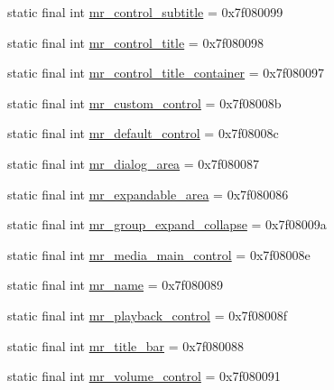 \begin{CompactItemize}
\item 
static final int \hyperlink{classandroid_1_1support_1_1graphics_1_1drawable_1_1_r_1_1id_e5a65a00b707670e18d959e97b9fd855}{mr\_\-control\_\-subtitle} = 0x7f080099
\item 
static final int \hyperlink{classandroid_1_1support_1_1graphics_1_1drawable_1_1_r_1_1id_81fac9292661e4502e602bba3b30abbc}{mr\_\-control\_\-title} = 0x7f080098
\item 
static final int \hyperlink{classandroid_1_1support_1_1graphics_1_1drawable_1_1_r_1_1id_1b9d52d6a6a8135008e786a7ff9d0e48}{mr\_\-control\_\-title\_\-container} = 0x7f080097
\item 
static final int \hyperlink{classandroid_1_1support_1_1graphics_1_1drawable_1_1_r_1_1id_e15581ce8c6802f902d4b3cb4029c5d1}{mr\_\-custom\_\-control} = 0x7f08008b
\item 
static final int \hyperlink{classandroid_1_1support_1_1graphics_1_1drawable_1_1_r_1_1id_dbf4a0f605692a7ca11e0a5dcc263946}{mr\_\-default\_\-control} = 0x7f08008c
\item 
static final int \hyperlink{classandroid_1_1support_1_1graphics_1_1drawable_1_1_r_1_1id_c086f96063efac0f7daf85971fcd07f6}{mr\_\-dialog\_\-area} = 0x7f080087
\item 
static final int \hyperlink{classandroid_1_1support_1_1graphics_1_1drawable_1_1_r_1_1id_c8c6d6f8ad5d6ae65ef01369ca169afd}{mr\_\-expandable\_\-area} = 0x7f080086
\item 
static final int \hyperlink{classandroid_1_1support_1_1graphics_1_1drawable_1_1_r_1_1id_615dd3e5133a24f7caa1ee161c69beb0}{mr\_\-group\_\-expand\_\-collapse} = 0x7f08009a
\item 
static final int \hyperlink{classandroid_1_1support_1_1graphics_1_1drawable_1_1_r_1_1id_7732016733e5530b3d691d55f4920cf1}{mr\_\-media\_\-main\_\-control} = 0x7f08008e
\item 
static final int \hyperlink{classandroid_1_1support_1_1graphics_1_1drawable_1_1_r_1_1id_0822ac757e3b867ee015d60c9bac01fa}{mr\_\-name} = 0x7f080089
\item 
static final int \hyperlink{classandroid_1_1support_1_1graphics_1_1drawable_1_1_r_1_1id_13fd2eec87dea1be2a782c282ba49f3e}{mr\_\-playback\_\-control} = 0x7f08008f
\item 
static final int \hyperlink{classandroid_1_1support_1_1graphics_1_1drawable_1_1_r_1_1id_db14230cfef5532faccaf592d9e8bd78}{mr\_\-title\_\-bar} = 0x7f080088
\item 
static final int \hyperlink{classandroid_1_1support_1_1graphics_1_1drawable_1_1_r_1_1id_e01d57c0f9ddc9491173ca7787ff2078}{mr\_\-volume\_\-control} = 0x7f080091

\end{CompactItemize}
